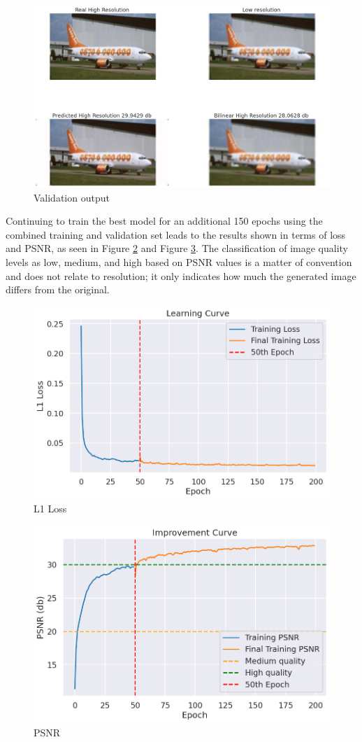 \documentclass[../report.tex]{subfiles}
\begin{document}
\begin{figure}[H]
	\caption{Validation output}
	\centering
	\label{fig:validation}
	\includegraphics[width=\textwidth]{../images/validation.png}
\end{figure}
Continuing to train the best model for an additional 150 epochs using the combined training and validation set leads to the results shown in terms of loss and PSNR, as seen in Figure \ref{fig:loss} and Figure \ref{fig:db}. The classification of image quality levels as low, medium, and high based on PSNR values is a matter of convention and does not relate to resolution; it only indicates how much the generated image differs from the original.
\begin{figure}[H]
	\caption{L1 Loss}
	\centering
	\label{fig:loss}
	\includegraphics[width=\textwidth]{../images/loss.png}
\end{figure}

\begin{figure}[H]
	\caption{PSNR}
	\centering
	\label{fig:db}
	\includegraphics[width=\textwidth]{../images/db.png}
\end{figure}


	
\end{document}
